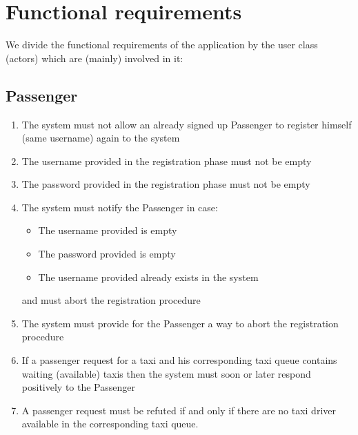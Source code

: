 \pagebreak
\section{Functional requirements}
We divide the functional requirements of the application by the user class (actors) which are (mainly) involved in it:
\subsection{Passenger}
\begin{enumerate}
\item The system must not allow an already signed up Passenger to register himself (same username) again to the system
\item The username provided in the registration phase must not be empty
\item The password provided in the registration phase must not be empty
\item The system must notify the Passenger in case: 
	\begin{itemize}
	\item The username provided is empty
	\item The password provided is empty
	\item The username provided already exists in the system
	\end{itemize}
	and must abort the registration procedure
\item The system must provide for the Passenger a way to abort the registration procedure
\item If a passenger request for a taxi and his corresponding taxi queue contains waiting (available) taxis then the system must soon or later respond positively to the Passenger
\item A passenger request must be refuted if and only if there are no taxi driver available in the corresponding taxi queue.
\end{enumerate}


